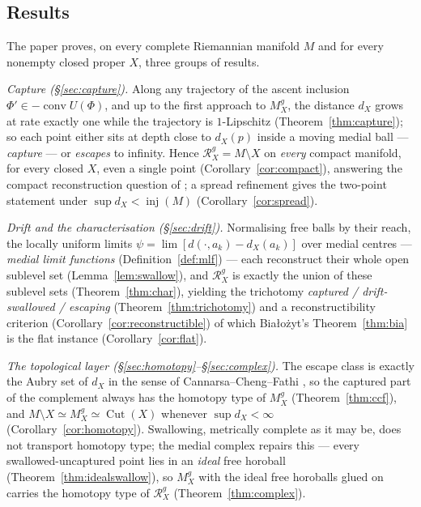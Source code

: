 \documentclass[11pt]{article}
\theoremstyle{remark}
\newcommand{\X}{X}
\newcommand{\Mg}{M^{g}_{\X}}
\newcommand{\Rg}{\mathcal{R}^{g}_{\X}}
\newcommand{\dX}{d_{\X}}
\newcommand{\conv}{\operatorname{conv}}
\newcommand{\inj}{\operatorname{inj}}
\newcommand{\Cut}{\operatorname{Cut}}
\begin{document}
\subsection{Results}\label{sec:results}

The paper proves, on every complete Riemannian manifold $M$ and for
every nonempty closed proper $\X$, three groups of results.

\emph{Capture (\S\ref{sec:capture}).} Along any trajectory of the
ascent inclusion $\Phi'\in-\conv U(\Phi)$, and up to the first
approach to $\Mg$, the distance $\dX$ grows at rate exactly one while
the trajectory is $1$-Lipschitz (Theorem~\ref{thm:capture}); so each
point either sits at depth close to $\dX(p)$ inside a moving medial
ball --- \emph{capture} --- or \emph{escapes} to infinity. Hence
$\Rg=M\setminus\X$ on \emph{every} compact manifold, for every closed
$\X$, even a single point (Corollary~\ref{cor:compact}), answering
the compact reconstruction question of \cite[\S5.2]{Bia}; a spread
refinement gives the two-point statement under $\sup\dX<\inj(M)$
(Corollary~\ref{cor:spread}).

\emph{Drift and the characterisation (\S\ref{sec:drift}).}
Normalising free balls by their reach, the locally uniform limits
$\psi=\lim[d(\cdot,a_{k})-\dX(a_{k})]$ over medial centres ---
\emph{medial limit functions} (Definition~\ref{def:mlf}) --- each
reconstruct their whole open sublevel set (Lemma~\ref{lem:swallow}),
and $\Rg$ is exactly the union of these sublevel sets
(Theorem~\ref{thm:char}), yielding the trichotomy \emph{captured /
drift-swallowed / escaping} (Theorem~\ref{thm:trichotomy}) and a
reconstructibility criterion (Corollary~\ref{cor:reconstructible}) of
which Bia\l{}o\.zyt's Theorem~\ref{thm:bia} is the flat instance
(Corollary~\ref{cor:flat}).

\emph{The topological layer (\S\ref{sec:homotopy}--\S\ref{sec:complex}).}
The escape class is exactly the Aubry set of $\dX$ in the sense of
Cannarsa--Cheng--Fathi \cite{CCF}, so the captured part of the
complement always has the homotopy type of $\Mg$
(Theorem~\ref{thm:ccf}), and $M\setminus\X\simeq\Mg\simeq\Cut(\X)$
whenever $\sup\dX<\infty$ (Corollary~\ref{cor:homotopy}). Swallowing,
metrically complete as it may be, does not transport homotopy type;
the medial complex repairs this --- every swallowed-uncaptured point
lies in an \emph{ideal} free horoball
(Theorem~\ref{thm:idealswallow}), so $\Mg$ with the ideal free
horoballs glued on carries the homotopy type of $\Rg$
(Theorem~\ref{thm:complex}).
\end{document}
